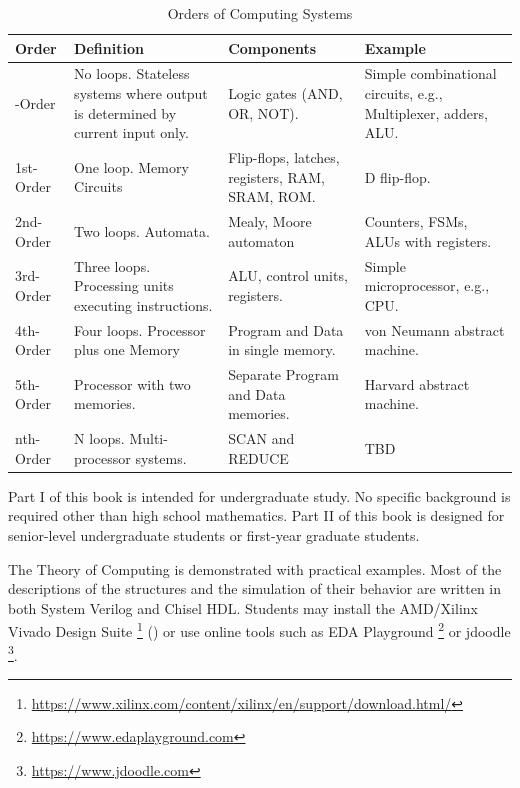 \documentclass[11pt]{book}
\begin{document}
\begin{table}[h!]
\centering
\renewcommand{\arraystretch}{1.2} %
\begin{tabular}{|>{\centering\arraybackslash}m{2cm} | >{\centering\arraybackslash}m{4cm} | >{\centering\arraybackslash}m{4cm} | >{\centering\arraybackslash}m{4cm}|}
\hline
\textbf{Order} & \textbf{Definition} & \textbf{Components} & \textbf{Example} \\ \hline

0-Order & No loops. Stateless systems where output is determined by current input only. & Logic gates (AND, OR, NOT). & Simple combinational circuits, e.g., Multiplexer, adders, ALU. \\ \hline

1st-Order & One loop. Memory Circuits & Flip-flops, latches, registers, RAM, SRAM, ROM. & D flip-flop. \\ \hline

2nd-Order & Two loops. Automata. & Mealy, Moore automaton & Counters, FSMs, ALUs with registers. \\ \hline

3rd-Order & Three loops. Processing units executing instructions. & ALU, control units, registers. & Simple microprocessor, e.g., CPU. \\ \hline

4th-Order & Four loops. Processor plus one Memory & Program and Data in single memory. & von Neumann abstract machine. \\ \hline

5th-Order & Processor with two memories. & Separate Program and Data memories. & Harvard abstract machine. \\ \hline

nth-Order & N loops. Multi-processor systems. & SCAN and REDUCE & TBD \\ \hline

\end{tabular}
\caption{Orders of Computing Systems}
\label{tab:orders_of_computing_systems}
\end{table}


Part I of this book is intended for undergraduate study. No specific background is required other than high school mathematics. Part II of this book is designed for senior-level undergraduate students or first-year graduate students.

The Theory of Computing is demonstrated with practical examples. 
Most of the descriptions of the structures and the simulation of their behavior are written in both System Verilog and Chisel HDL. Students may install the AMD/Xilinx Vivado Design Suite \footnote{\url{https://www.xilinx.com/content/xilinx/en/support/download.html/}} (\url{}) or use online tools such as EDA Playground \footnote{\url{https://www.edaplayground.com}} or jdoodle \footnote{\url{https://www.jdoodle.com}}.
\end{document}

